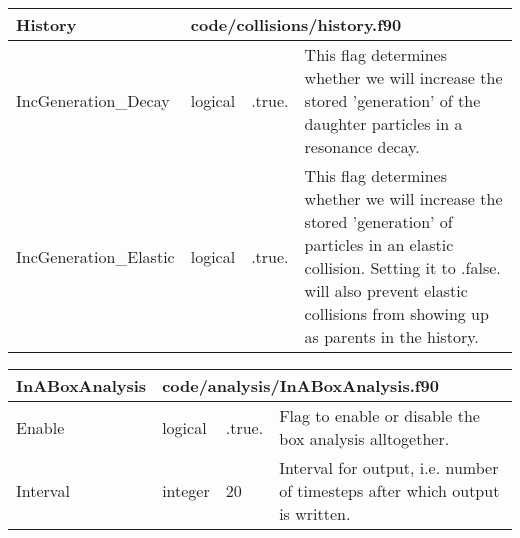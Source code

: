 \documentclass{article}
\begin{document}
\begin{longtable}{llll}
\toprule
\textbf{\large{History}} & \multicolumn{3}{l}{\footnotesize{code/collisions/history.f90}}\\*
\midrule
\endfirsthead
\midrule
\endhead
IncGeneration\_Decay & \begin{minipage}[t]{2cm}logical\end{minipage} & \begin{minipage}[t]{2cm}.true.\end{minipage} & \begin{minipage}[t]{12cm}This flag determines whether we will increase the stored 'generation' of the daughter particles in a resonance decay.\end{minipage}\\*
\midrule
IncGeneration\_Elastic & \begin{minipage}[t]{2cm}logical\end{minipage} & \begin{minipage}[t]{2cm}.true.\end{minipage} & \begin{minipage}[t]{12cm}This flag determines whether we will increase the stored 'generation' of particles in an elastic collision. Setting it to .false. will also prevent elastic collisions from showing up as parents in the history.\end{minipage}\\*
\bottomrule
\end{longtable}
{ }




\begin{longtable}{llll}
\toprule
\textbf{\large{InABoxAnalysis}} & \multicolumn{3}{l}{\footnotesize{code/analysis/InABoxAnalysis.f90}}\\*
\midrule
\endfirsthead
\midrule
\endhead
Enable & \begin{minipage}[t]{2cm}logical\end{minipage} & \begin{minipage}[t]{2cm}.true.\end{minipage} & \begin{minipage}[t]{12cm}Flag to enable or disable the box analysis alltogether.\end{minipage}\\*
\midrule
Interval & \begin{minipage}[t]{2cm}integer\end{minipage} & \begin{minipage}[t]{2cm}20\end{minipage} & \begin{minipage}[t]{12cm}Interval for output, i.e. number of timesteps after which output is written.\end{minipage}\\*
\bottomrule
\end{longtable}
{ }
\end{document}

